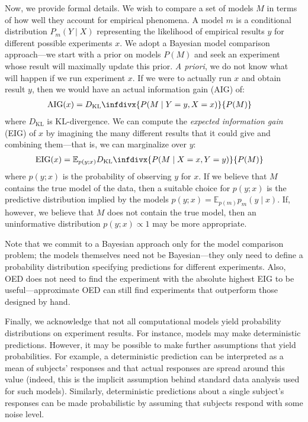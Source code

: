 \documentclass[10pt,letterpaper]{article}
\newcommand{\dkl}{D_\mathrm{KL}\infdivx}
\begin{document}
Now, we provide formal details.
We wish to compare a set of models $M$ in terms of how well they account for empirical phenomena.
A model $m$ is a conditional distribution $P_m(Y \mid X)$ representing the likelihood of empirical results $y$ for different possible experiments $x$.
We adopt a Bayesian model comparison approach---we start with a prior on models $P(M)$ and seek an experiment whose result will maximally update this prior.
\emph{A priori}, we do not know what will happen if we run experiment $x$.
If we were to actually run $x$ and obtain result $y$, then we would have an actual information gain (AIG) of:
\begin{align}
  \mathrm{AIG}(x) &= \dkl{P(M \mid Y = y, X = x)}{P(M)} \label{eq:aig}
\end{align}
where $D_\mathrm{KL}$ is KL-divergence. We can compute the \emph{expected information gain} (EIG) of $x$ by imagining the many different results that it could give and combining them---that is, we can marginalize over $y$:
\begin{align}
  \mathrm{EIG}(x) &= {\mathbb E}_{p(y ; x)} \dkl{ P(M \mid X = x, Y = y) }{ P(M) }  \label{eq:oed}
\end{align}
where $p(y ; x)$ is the probability of observing $y$ for $x$.
If we believe that $M$ contains the true model of the data, then a suitable choice for $p(y ; x)$ is the predictive distribution implied by the models $p(y ; x) = {\mathbb E}_{p(m)} p_m(y \mid x)$.
If, however, we believe that $M$ does not contain the true model, then an uninformative distribution $p(y ; x) \propto 1$ may be more appropriate.

Note that we commit to a Bayesian approach only for the model comparison problem; the models themselves need not be Bayesian---they only need to define a probability distribution specifying predictions for different experiments.
Also, OED does not need to find the experiment with the absolute highest EIG to be useful---approximate OED can still find experiments that outperform those designed by hand.

Finally, we acknowledge that not all computational models yield probability distributions on experiment results.
For instance, models may make deterministic predictions.
However, it may be possible to make further assumptions that yield probabilities.
For example, a deterministic prediction can be interpreted as a mean of subjects' responses and that actual responses are spread around this value (indeed, this is the implicit assumption behind standard data analysis used for such models).
Similarly, deterministic predictions about a single subject's responses can be made probabilistic by assuming that subjects respond with some noise level.
\end{document}
